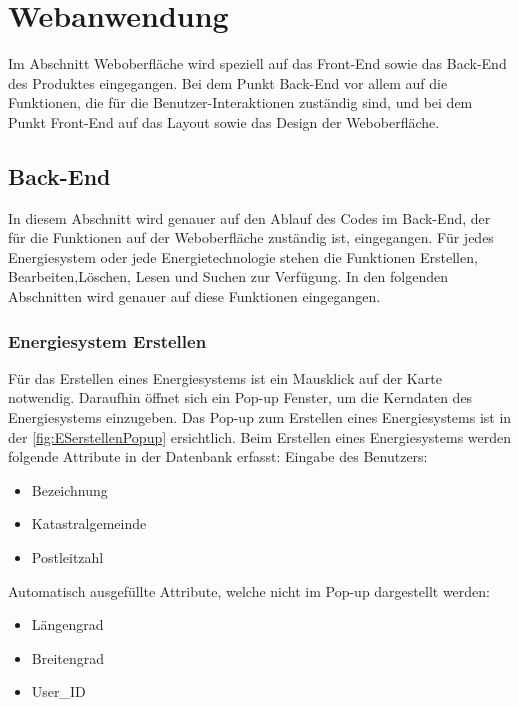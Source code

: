 \section{Webanwendung}
Im Abschnitt Weboberfläche wird speziell auf das Front-End sowie das Back-End des Produktes eingegangen. Bei dem Punkt Back-End vor allem auf die Funktionen, die für die Benutzer-Interaktionen zuständig sind, und bei dem Punkt Front-End auf das Layout sowie das Design der Weboberfläche.


\subsection{Back-End}
In diesem Abschnitt wird genauer auf den Ablauf des Codes im Back-End, der für die Funktionen auf der Weboberfläche zuständig ist, eingegangen. 
Für jedes Energiesystem oder jede Energietechnologie stehen die Funktionen Erstellen, Bearbeiten,Löschen, Lesen und Suchen zur Verfügung. In den folgenden Abschnitten wird genauer auf diese Funktionen eingegangen.


\subsubsection{Energiesystem Erstellen}
Für das Erstellen eines Energiesystems ist ein Mausklick auf der Karte notwendig. Daraufhin öffnet sich ein Pop-up Fenster, um die Kerndaten des Energiesystems einzugeben.
Das Pop-up zum Erstellen eines Energiesystems ist in der \autoref{fig:ESerstellenPopup} ersichtlich.
Beim Erstellen eines Energiesystems werden folgende Attribute in der Datenbank erfasst:
\newline 
\newline Eingabe des Benutzers:
\begin{itemize}
	\item Bezeichnung 
	\item Katastralgemeinde
	\item Postleitzahl
\end{itemize}

Automatisch ausgefüllte Attribute, welche nicht im Pop-up dargestellt werden:
\begin{itemize}
	\item Längengrad 
	\item Breitengrad
	\item User\_ID
\end{itemize}


